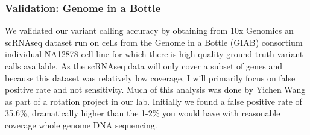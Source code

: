 \subsubsection{Validation: Genome in a Bottle}
\par{
We validated our variant calling accuracy by obtaining from 10x Genomics an scRNAseq dataset run on cells from the Genome in a Bottle (GIAB) consortium individual NA12878 cell line for which there is high quality ground truth variant calls available\cite{giab}. As the scRNAseq data will only cover a subset of genes and because this dataset was relatively low coverage, I will primarily focus on false positive rate and not sensitivity. Much of this analysis was done by Yichen Wang as part of a rotation project in our lab. Initially we found a false positive rate of 35.6\%, dramatically higher than the 1-2\% you would have with reasonable coverage whole genome DNA sequencing.
}


